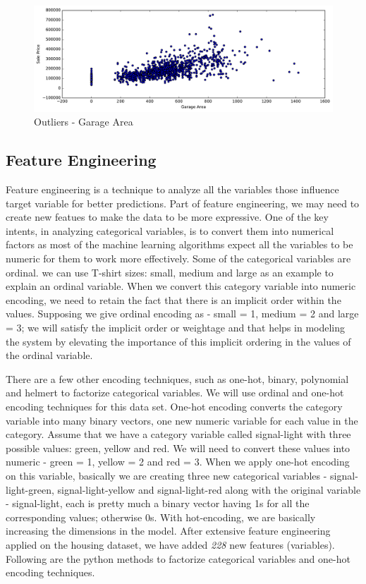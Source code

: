 \documentclass[sigconf]{acmart}
\begin{document}
	\begin{figure}[H]
		\centering
		\includegraphics[width=.95\columnwidth]{images/garage_area_outlier}	
		\caption{Outliers - Garage Area} \label{fig:garage_area_outlier} 
	\end{figure}
	
	\subsection{Feature Engineering}
	
	Feature engineering is a technique to analyze all the variables those influence target variable for better predictions. Part of feature engineering, we may need to create new featues to make the data to be more expressive. One of the key intents, in analyzing categorical variables, is to convert them into numerical factors as most of the machine learning algorithms expect all the variables to be numeric for them to work more effectively. Some of the categorical variables are ordinal. we can use T-shirt sizes: small, medium and large as an example to explain an ordinal variable. When we convert this category variable into numeric encoding, we need to retain the fact that there is an implicit order within the values. Supposing we give ordinal encoding as - small = 1, medium = 2 and large = 3; we will satisfy the implicit order or weightage and that helps in modeling the system by elevating the importance of this implicit ordering in the values of the ordinal variable.
	
	There are a few other encoding techniques, such as one-hot, binary, polynomial and helmert to factorize categorical variables. We will use ordinal and one-hot encoding techniques for this data set. One-hot encoding converts the category variable into many binary vectors, one new numeric variable for each value in the category. Assume that we have a category variable called signal-light with three possible values: green, yellow and red. We will need to convert these values into numeric - green = 1, yellow = 2 and red = 3. When we apply one-hot encoding on this variable, basically we are creating three new categorical variables - signal-light-green, signal-light-yellow and signal-light-red along with the original variable - signal-light, each is pretty much a binary vector having 1s for all the corresponding values; otherwise 0s. With hot-encoding, we are basically increasing the dimensions in the model. After extensive feature engineering applied on the housing dataset, we have added {\em 228} new features (variables). Following are the python methods to factorize categorical variables and one-hot encoding techniques. 
	
\end{document}
